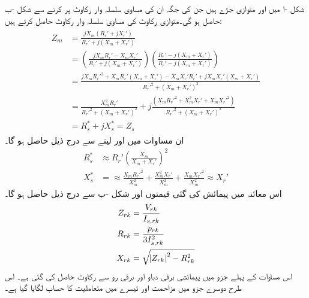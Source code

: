 شکل  -ا میں   اور  متوازی جڑے ہیں جن  کی جگہ ان کی مساوی سلسلہ وار رکاوٹ پر کرنے سے شکل -ب حاصل ہو گی۔متوازی رکاوٹ  کی مساوی سلسلہ وار رکاوٹ   حاصل کرتے ہیں:
\begin{gather}
\begin{aligned}
Z_m&=\frac{j X_m (R_r'+j X_r')}{R_r'+j(X_m+X_r')}\\
&=\left( \frac{j X_m R_r' -X_m X_r'}{R_r'+j(X_m+X_r')} \right) \left( \frac{R_r'-j(X_m+X_r')}{R_r'-j(X_m+X_r')}\right)\\
&=\frac{jX_m R_r'^2+X_m R_r'(X_m+X_r')-X_m X_r' R_r' +j X_m X_r'(X_m+X_r')}{R_r'^2+(X_m+X_r')^2}\\
&=\frac{X_m^2 R_r'}{R_r'^2+(X_m+X_r')^2}+j\frac{(X_m R_r'^2+X_m^2 X_r'+X_m X_r'^2)}{R_r'^2+(X_m+X_r')^2}\\
&=R_s^*+j X_s^* =Z_s
\end{aligned}
\end{gather}
ان مساوات میں  اور   لینے سے درج ذیل حاصل ہو گا۔
\begin{align}\label{مساوات_امالی_تقریبا_مزاحمت}
R_s^*& \approx R_r' \left(\frac{X_m}{X_m+X_r'} \right)^2 \\
X_s^*&= \approx  \frac{X_m R_r'^2}{X_m^2}+\frac{X_m^2 X_r'}{X_m^2}+\frac{X_m X_r'^2}{X_m^2} \approx X_r'
\end{align}
اس معائنہ میں پیمائش کی گئی قیمتوں اور شکل -ب سے درج ذیل حاصل ہو گا۔
\begin{gather}
\begin{aligned}
Z_{rk} &=\frac{V_{rk}}{I_{s,rk}}\\
R_{rk}&=\frac{p_{rk}}{3 I_{s,rk}^2}\\
X_{rk}&=\sqrt{\abs{Z_{rk}}^2-R_{rk}^2}
\end{aligned}
\end{gather}
اس مساوات کے پہلے جزو میں پیمائشی برقی دباو اور برقی رو سے رکاوٹ حاصل کی گئی ہے۔ اس طرح دوسرے جزو میں مزاحمت اور تیسرے میں متعاملیت کا حساب لگایا گیا ہے۔

